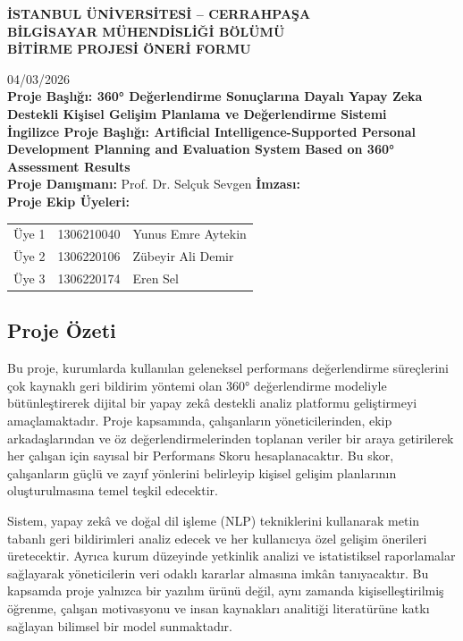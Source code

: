 \documentclass[a4paper,12pt]{article}
\begin{document}
\begin{center}

\textbf{\Large İSTANBUL ÜNİVERSİTESİ – CERRAHPAŞA}\\[4pt]
\textbf{\Large BİLGİSAYAR MÜHENDİSLİĞİ BÖLÜMÜ}\\[8pt]
\textbf{\large BİTİRME PROJESİ ÖNERİ FORMU}
\end{center}
\vspace{1cm}
\hfill 04/03/2026 \\[6pt]
\noindent \textbf{Proje Başlığı: 360° Değerlendirme Sonuçlarına Dayalı Yapay Zeka Destekli Kişisel Gelişim Planlama ve Değerlendirme Sistemi} \\[6pt]
\noindent \textbf{İngilizce Proje Başlığı: Artificial Intelligence-Supported Personal Development Planning and Evaluation System Based on 360° Assessment Results} \\[6pt]
\textbf{Proje Danışmanı:} Prof. Dr. Selçuk Sevgen \hfill \textbf{İmzası:} \\[6pt]
\textbf{Proje Ekip Üyeleri:}

\begin{tabular}{p{2cm}p{4cm}p{6cm}}
Üye 1 & 1306210040 & Yunus Emre Aytekin \\
Üye 2 & 1306220106 & Zübeyir Ali Demir \\
Üye 3 & 1306220174 & Eren Sel \\

\end{tabular}

\subsection*{Proje Özeti}
\noindent
Bu proje, kurumlarda kullanılan geleneksel performans değerlendirme süreçlerini çok kaynaklı geri bildirim yöntemi olan 360° değerlendirme modeliyle bütünleştirerek dijital bir yapay zekâ destekli analiz platformu geliştirmeyi amaçlamaktadır. Proje kapsamında, çalışanların yöneticilerinden, ekip arkadaşlarından ve öz değerlendirmelerinden toplanan veriler bir araya getirilerek her çalışan için sayısal bir Performans Skoru hesaplanacaktır. Bu skor, çalışanların güçlü ve zayıf yönlerini belirleyip kişisel gelişim planlarının oluşturulmasına temel teşkil edecektir. 

Sistem, yapay zekâ ve doğal dil işleme (NLP) tekniklerini kullanarak metin tabanlı geri bildirimleri analiz edecek ve her kullanıcıya özel gelişim önerileri üretecektir. Ayrıca kurum düzeyinde yetkinlik analizi ve istatistiksel raporlamalar sağlayarak yöneticilerin veri odaklı kararlar almasına imkân tanıyacaktır. Bu kapsamda proje yalnızca bir yazılım ürünü değil, aynı zamanda kişiselleştirilmiş öğrenme, çalışan motivasyonu ve insan kaynakları analitiği literatürüne katkı sağlayan bilimsel bir model sunmaktadır. 
\end{document}
